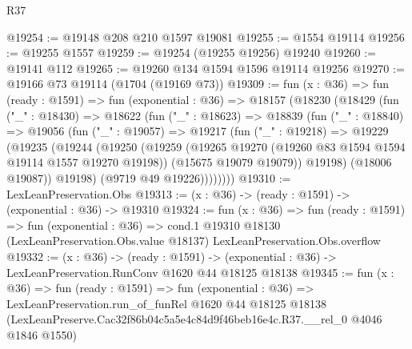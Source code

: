 \begin{lexlean}{R37}
\begin{coremodule}
@19254 := @19148 @208 @210 @1597 @19081
@19255 := @1554 @19114
@19256 := @19255 @1557
@19259 := @19254 (@19255 @19256) @19240
@19260 := @19141 @112
@19265 := @19260 @134 @1594 @1596 @19114 @19256
@19270 := @19166 @73 @19114 (@1704 (@19169 @73))
@19309 := fun (x : @36) =>
  fun (ready : @1591) =>
  fun (exponential : @36) =>
  @18157
    (@18230
      (@18429
        (fun ("_" : @18430) =>
        @18622
          (fun ("_" : @18623) =>
          @18839
            (fun ("_" : @18840) =>
            @19056
              (fun ("_" : @19057) =>
              @19217
                (fun ("_" : @19218) =>
                @19229
                  (@19235
                    (@19244
                      (@19250
                        (@19259
                          (@19265 @19270 (@19260 @83 @1594 @1594 @19114 @1557 @19270 @19198))
                          (@15675 @19079 @19079))
                        @19198)
                      (@18006 @19087))
                    @19198)
                  (@9719 @49 @19226))))))))
@19310 := LexLeanPreservation.Obs
@19313 := (x : @36) -> (ready : @1591) -> (exponential : @36) -> @19310
@19324 := fun (x : @36) =>
  fun (ready : @1591) =>
  fun (exponential : @36) =>
  cond.{1} @19310 @18130 (LexLeanPreservation.Obs.value @18137) LexLeanPreservation.Obs.overflow
@19332 := (x : @36) ->
  (ready : @1591) -> (exponential : @36) -> LexLeanPreservation.RunConv @1620 @44 @18125 @18138
@19345 := fun (x : @36) =>
  fun (ready : @1591) =>
  fun (exponential : @36) =>
  LexLeanPreservation.run_of_funRel
    @1620
    @44
    @18125
    @18138
    (LexLeanPreserve.Cac32f86b04c5a5e4c84d9f46beb16e4c.R37.__rel_0 @4046 @1846 @1550)
\end{coremodule}
\end{lexlean}
